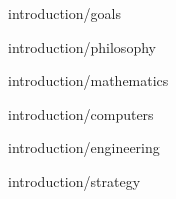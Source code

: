 
\component introduction/goals

\component introduction/philosophy

\component introduction/mathematics

\component introduction/computers

\component introduction/engineering

\component introduction/strategy

